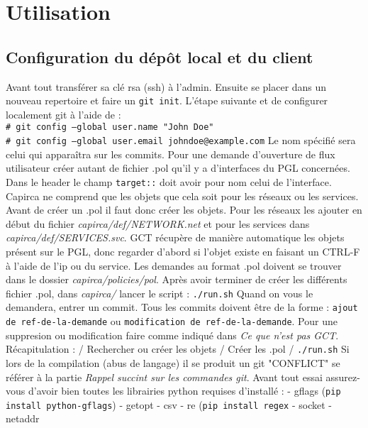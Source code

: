 \documentclass{article}
\newcommand{\shellcmdd}[1]{\\\indent\indent\texttt{\footnotesize\# #1}}
\begin{document}
  \section{Utilisation}
    \subsection{Configuration du dépôt local et du client}

      Avant tout transférer sa clé rsa (ssh) à l'admin. Ensuite se placer dans un nouveau repertoire et faire un \texttt{git init}.
      L'étape suivante et de configurer localement git à l'aide de : \shellcmdd{git config --global user.name "John Doe"}
      \shellcmdd{git config --global user.email johndoe@example.com}\smallbreak
      \noindent Le nom spécifié sera celui qui apparaîtra sur les commits.
      Pour une demande d'ouverture de flux utilisateur créer autant de fichier .pol qu'il y a d'interfaces du PGL concernées.
      Dans le header le champ \texttt{target::} doit avoir pour nom celui de l'interface.
      Capirca ne comprend que les objets que cela soit pour les réseaux ou les services.
      Avant de créer un .pol il faut donc créer les objets. Pour les réseaux les ajouter en début du fichier \textit{capirca/def/NETWORK.net}
      et pour les services dans \textit{capirca/def/SERVICES.svc}. GCT récupère de manière automatique les objets présent
      sur le PGL, donc regarder d'abord si l'objet existe en faisant un CTRL-F à l'aide de l'ip ou du service.
      Les demandes au format .pol doivent se trouver dans le dossier \textit{capirca/policies/pol}.
      Après avoir terminer de créer les différents fichier .pol, dans \textit{capirca/} lancer le script  : \texttt{./run.sh} \smallbreak
      \noindent Quand on vous le demandera, entrer un commit. Tous les commits doivent être de la forme : \texttt{ajout de ref-de-la-demande} ou
      \texttt{modification de ref-de-la-demande}. Pour une suppresion ou modification faire comme indiqué dans \textit{Ce que n'est pas GCT}.
      \bigbreak Récapitulation : / Rechercher ou créer les objets / Créer les .pol / \texttt{./run.sh} \bigbreak
      \noindent Si lors de la compilation (abus de langage) il se produit un git "CONFLICT" se référer à la partie \textit{Rappel succint
      sur les commandes git}.
      Avant tout essai assurez-vous d'avoir bien toutes les librairies python requises d'installé : \smallbreak
      - gflags (\texttt{pip install python-gflags}) \smallbreak
      - getopt \smallbreak
      - csv \smallbreak
      - re (\texttt{pip install regex}\smallbreak
      - socket \smallbreak
      - netaddr
\end{document}
